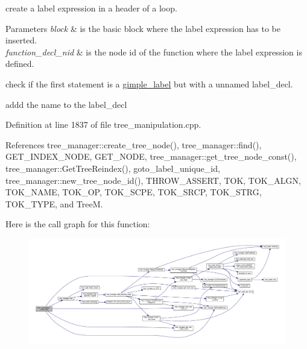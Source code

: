 create a label expression in a header of a loop. 


\begin{DoxyParams}{Parameters}
{\em block} & is the basic block where the label expression has to be inserted. \\
\hline
{\em function\+\_\+decl\+\_\+nid} & is the node id of the function where the label expression is defined. \\
\hline
\end{DoxyParams}
check if the first statement is a \hyperlink{structgimple__label}{gimple\+\_\+label} but with a unnamed label\+\_\+decl.

addd the name to the label\+\_\+decl 

Definition at line 1837 of file tree\+\_\+manipulation.\+cpp.



References tree\+\_\+manager\+::create\+\_\+tree\+\_\+node(), tree\+\_\+manager\+::find(), G\+E\+T\+\_\+\+I\+N\+D\+E\+X\+\_\+\+N\+O\+DE, G\+E\+T\+\_\+\+N\+O\+DE, tree\+\_\+manager\+::get\+\_\+tree\+\_\+node\+\_\+const(), tree\+\_\+manager\+::\+Get\+Tree\+Reindex(), goto\+\_\+label\+\_\+unique\+\_\+id, tree\+\_\+manager\+::new\+\_\+tree\+\_\+node\+\_\+id(), T\+H\+R\+O\+W\+\_\+\+A\+S\+S\+E\+RT, T\+OK, T\+O\+K\+\_\+\+A\+L\+GN, T\+O\+K\+\_\+\+N\+A\+ME, T\+O\+K\+\_\+\+OP, T\+O\+K\+\_\+\+S\+C\+PE, T\+O\+K\+\_\+\+S\+R\+CP, T\+O\+K\+\_\+\+S\+T\+RG, T\+O\+K\+\_\+\+T\+Y\+PE, and TreeM.

Here is the call graph for this function\+:
\nopagebreak
\begin{figure}[H]
\begin{center}
\leavevmode
\includegraphics[width=350pt]{d0/d99/classtree__manipulation_a540fd36e16f7bc18c3f9e7a3737a3eb4_cgraph}
\end{center}
\end{figure}
\mbox{\label{classtree__manipulation_a4e5bf5b7cfb6244c0a2b7e13c0ac4514}} 
